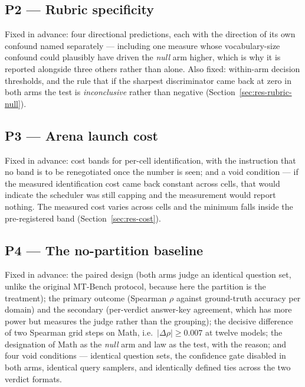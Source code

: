 \subsection*{P2 --- Rubric specificity}

Fixed in advance: four directional predictions, each with the direction
of its own confound named separately --- including one measure whose
vocabulary-size confound could plausibly have driven the \emph{null}
arm higher, which is why it is reported alongside three others rather
than alone. Also fixed: within-arm decision thresholds, and the rule
that if the sharpest discriminator came back at zero in both arms the
test is \emph{inconclusive} rather than negative
(Section~\ref{sec:res-rubric-null}).


\subsection*{P3 --- Arena launch cost}

Fixed in advance: cost bands for per-cell identification, with the
instruction that no band is to be renegotiated once the number is seen;
and a void condition --- if the measured identification cost came back
constant across cells, that would indicate the scheduler was still
capping and the measurement would report nothing. The measured cost
varies across cells and the minimum falls inside the pre-registered
band (Section~\ref{sec:res-cost}).

\subsection*{P4 --- The no-partition baseline}

Fixed in advance: the paired design (both arms judge an identical
question set, unlike the original MT-Bench protocol, because here the
partition is the treatment); the primary outcome (Spearman $\rho$
against ground-truth accuracy per domain) and the secondary
(per-verdict answer-key agreement, which has more power but measures
the judge rather than the grouping); the decisive difference of two
Spearman grid steps on Math, i.e.\ $|\Delta\rho| \geq 0.007$ at twelve
models; the designation of Math as the \emph{null} arm and law as the
test, with the reason; and four void conditions --- identical question
sets, the confidence gate disabled in both arms, identical query
samplers, and identically defined ties across the two verdict formats.

